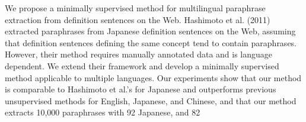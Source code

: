We propose a minimally supervised method for multilingual paraphrase extraction from definition sentences on the Web. Hashimoto et al. (2011) extracted
 paraphrases from Japanese definition sentences on the Web, assuming that
 definition sentences defining the same concept tend to contain paraphrases.
 However, their method requires manually annotated data and is language
 dependent. We extend their framework and develop a minimally supervised method
 applicable to multiple languages. Our experiments show that our method is
 comparable to Hashimoto et al.'s for Japanese and outperforms previous
 unsupervised methods for English, Japanese, and Chinese, and that our method
 extracts 10,000 paraphrases with 92%
 Japanese, and 82%

